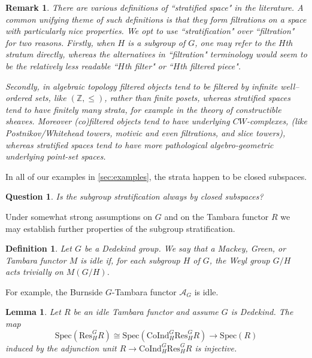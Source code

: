 \documentclass[11pt,dvipsnames]{amsart}
\newcommand{\Z}{\mathbb{Z}}
\newcommand{\A}{\mathcal{A}}
\newtheorem{lemma}[theorem]{Lemma}
\theoremstyle{BoldRemark}
\newtheorem{remark}[theorem]{Remark}
\newtheorem{definition}[theorem]{Definition}
\newtheorem{question}[theorem]{Question}
\newcommand{\Res}{\mathrm{Res}}
\newcommand{\Spec}{\mathrm{Spec}}
\newcommand{\Coind}{\mathrm{CoInd}}
\begin{document}
\begin{remark}
    There are various definitions of ``stratified space" in the literature. A common unifying theme of such definitions is that they form filtrations on a space with particularly nice properties. We opt to use ``stratification" over ``filtration" for two reasons. Firstly, when $H$ is a subgroup of $G$, one may refer to the $H$th stratum directly, whereas the alternatives in ``filtration" terminology would seem to be the relatively less readable ``$H$th filter" or ``$H$th filtered piece". 
    
    Secondly, in algebraic topology filtered objects tend to be filtered by infinite well--ordered sets, like $(\Z,\leq)$, rather than finite posets, whereas stratified spaces tend to have finitely many strata, for example in the theory of constructible sheaves. Moreover (co)filtered objects tend to have underlying $CW$-complexes, (like Postnikov/Whitehead towers, motivic and even filtrations, and slice towers), whereas stratified spaces tend to have more pathological algebro-geometric underlying point-set spaces.
\end{remark}

In all of our examples in \cref{sec:examples}, the strata happen to be closed subspaces.

\begin{question}
    Is the subgroup stratification always by closed subspaces?
\end{question}

Under somewhat strong assumptions on $G$ and on the Tambara functor $R$ we may establish further properties of the subgroup stratification.

\begin{definition}
    Let $G$ be a Dedekind group. We say that a Mackey, Green, or Tambara functor $M$ is \emph{idle} if, for each subgroup $H$ of $G$, the Weyl group $G/H$ acts trivially on $M(G/H)$.
\end{definition}

For example, the Burnside $G$-Tambara functor $\A_G$ is idle.

\begin{lemma}\label{lem:Nakaoka-spec-map-of-coind-unit-is-inj}
    Let $R$ be an idle Tambara functor and assume $G$ is Dedekind. The map 
    \[ 
        \Spec(\Res_H^G R) \cong \Spec(\Coind_H^G \Res_H^G R) \rightarrow \Spec(R)
    \] 
    induced by the adjunction unit $R \rightarrow \Coind_H^G \Res_H^G R$ is injective.
\end{lemma}
\end{document}

